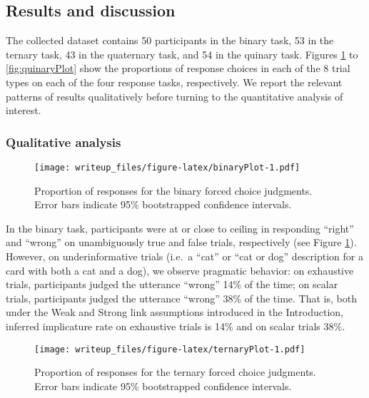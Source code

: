 \documentclass[man]{apa6}
\theoremstyle{definition}
\theoremstyle{definition}
\theoremstyle{definition}
\theoremstyle{remark}
\begin{document}
\subsection{Results and discussion}\label{results-and-discussion}

The collected dataset contains 50 participants in the binary task, 53 in
the ternary task, 43 in the quaternary task, and 54 in the quinary task.
Figures \ref{fig:binaryPlot} to \ref{fig:quinaryPlot} show the
proportions of response choices in each of the 8 trial types on each of
the four response tasks, respectively. We report the relevant patterns
of results qualitatively before turning to the quantitative analysis of
interest.

\subsubsection{Qualitative analysis}\label{qualitative-analysis}

\begin{figure}
\centering
\texttt{[image: writeup\_files/figure-latex/binaryPlot-1.pdf]}
\caption{\label{fig:binaryPlot}Proportion of responses for the binary forced
choice judgments. Error bars indicate 95\% bootstrapped confidence
intervals.}
\end{figure}

In the binary task, participants were at or close to ceiling in
responding \enquote{right} and \enquote{wrong} on unambiguously true and
false trials, respectively (see Figure \ref{fig:binaryPlot}). However,
on underinformative trials (i.e.~a \enquote{cat} or \enquote{cat or dog}
description for a card with both a cat and a dog), we observe pragmatic
behavior: on exhaustive trials, participants judged the utterance
\enquote{wrong} 14\% of the time; on scalar trials, participants judged
the utterance \enquote{wrong} 38\% of the time. That is, both under the
Weak and Strong link assumptions introduced in the Introduction,
inferred implicature rate on exhaustive trials is 14\% and on scalar
trials 38\%.

\begin{figure}
\centering
\texttt{[image: writeup\_files/figure-latex/ternaryPlot-1.pdf]}
\caption{\label{fig:ternaryPlot}Proportion of responses for the ternary
forced choice judgments. Error bars indicate 95\% bootstrapped
confidence intervals.}
\end{figure}
\end{document}
